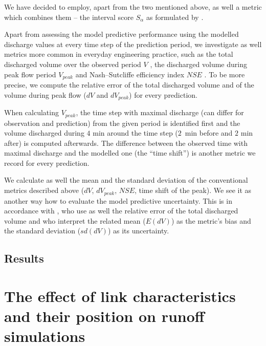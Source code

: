 \documentclass{ctuthesis}\usepackage[]{graphicx}\usepackage[]{color}
\begin{document}
We have decided to employ, apart from the two mentioned above,  as well a metric which combines them -- the interval score $S_\alpha$ as formulated by \cite{gneiting2007strictly}.

Apart from assessing the model  predictive performance using the modelled discharge values at every time step of the prediction period, we investigate as well metrics more common in everyday engineering practice, such as the total discharged volume over the observed period $V$ \citep[e.g.][]{fencl2013assessing}, the discharged volume during peak flow period $V_{peak}$  and Nash–Sutcliffe efficiency index $N\!S\!E$ \citep{nash1970river}. To be more precise, we compute the relative error of the total discharged volume and of the volume during peak flow ($dV$ and $dV_{peak}$) for every prediction. 

When calculating $V_{peak}$, the time step with maximal discharge (can differ for observation and prediction) from the given period is identified first and the volume discharged during $4$ min around the time step (\mbox{$2$ min} before and $2$ min after) is computed afterwards. The difference between the observed time with maximal discharge and the modelled one (the \enquote{time shift}) is another metric we record for every prediction.

We calculate as well the mean and the standard deviation of the conventional metrics described above ($dV$, $dV_{peak}$, $N\!S\!E$, time shift of the peak). We see it as another way how to evaluate the model  predictive uncertainty. This is in accordance with \cite{fencl2013assessing}, who use as well the relative error of the total discharged volume and who interpret the related mean ($E(dV)$) as the metric's  bias and the standard deviation  ($sd(dV)$) as its uncertainty. 



\section{Results}


        


\chapter{The effect of link characteristics and their position on runoff simulations} \label{chap5}
\end{document}
